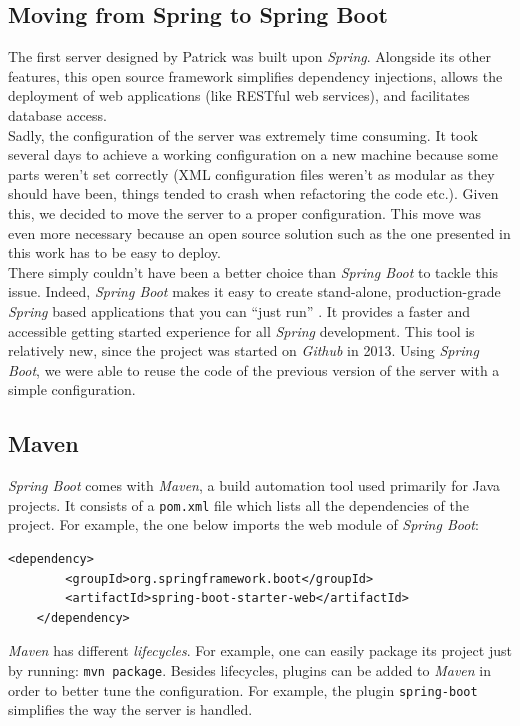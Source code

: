 \documentclass[a4paper, oneside, 11pt]{book}
\begin{document}
\subsection{Moving from Spring to Spring Boot}
The first server designed by Patrick was built upon \textit{Spring}. Alongside its other features, this open source framework simplifies dependency injections, allows the deployment of web applications (like RESTful web services), and facilitates database access.\\

Sadly, the configuration of the server was extremely time consuming. It took several days to achieve a working configuration on a new machine because some parts weren’t set correctly (XML configuration files weren’t as modular as they should have been, things tended to crash when refactoring the code etc.). Given this, we decided to move the server to a proper configuration. This move was even more necessary because an open source solution such as the one presented in this work has to be easy to deploy.\\

There simply couldn't have been a better choice than \textit{Spring Boot} to tackle this issue. Indeed, \textit{Spring Boot} makes it easy to create stand-alone, production-grade \textit{Spring} based applications that you can “just run” \cite{Springboot:online}. It provides a faster and accessible getting started experience for all \textit{Spring} development. This tool is relatively new, since the project was started on \textit{Github} in 2013. Using \textit{Spring Boot}, we were able to reuse the code of the previous version of the server with a simple configuration.

\subsection{Maven}
\textit{Spring Boot} comes with \textit{Maven}, a build automation tool used primarily for Java projects. It consists of a \texttt{pom.xml} file which lists all the dependencies of the project. For example, the one below imports the web module of \textit{Spring Boot}:

\begin{lstlisting}[breaklines]
	<dependency>
	    <groupId>org.springframework.boot</groupId>
	    <artifactId>spring-boot-starter-web</artifactId>
	</dependency>
\end{lstlisting}

\textit{Maven} has different \emph{lifecycles}. For example, one can easily package its project just by running: \texttt{mvn package}. Besides lifecycles, plugins can be added to \textit{Maven} in order to better tune the configuration. For example, the plugin \texttt{spring-boot} simplifies the way the server is handled.
\end{document}
